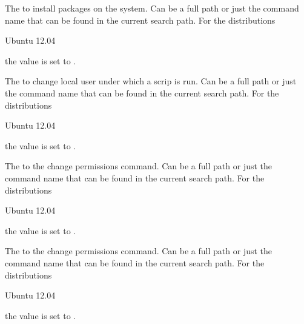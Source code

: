 
The  to install packages on the system. Can be a full path or
just the command name that can be found in the current search path. 
For the distributions
\begin{inparaitem}
\item[\TheDistribution{ubuntu}] Ubuntu 12.04
\end{inparaitem}
the value is set to .


The  to change local user under which a scrip is run. Can be a full path or
just the command name that can be found in the current search path. 
For the distributions
\begin{inparaitem}
\item[\TheDistribution{ubuntu}] Ubuntu 12.04
\end{inparaitem}
the value is set to .


The  to the change permissions command. Can be a full path or
just the command name that can be found in the current search path. 
For the distributions
\begin{inparaitem}
\item[\TheDistribution{ubuntu}] Ubuntu 12.04
\end{inparaitem}
the value is set to .


The  to the change permissions command. Can be a full path or
just the command name that can be found in the current search path. 
For the distributions
\begin{inparaitem}
\item[\TheDistribution{ubuntu}] Ubuntu 12.04
\end{inparaitem}
the value is set to .

